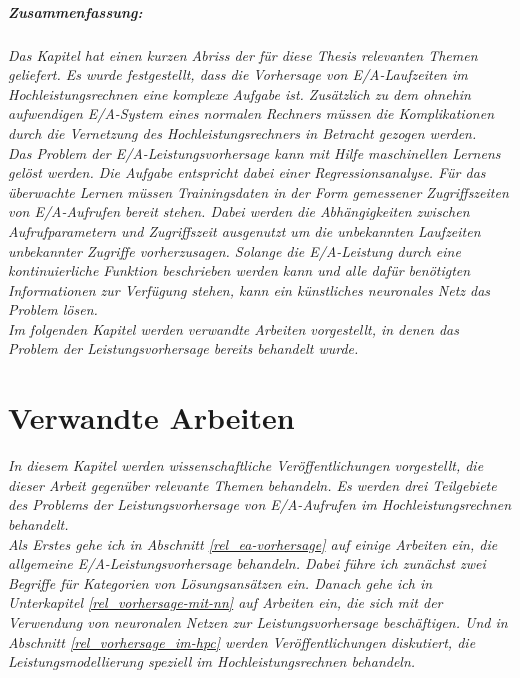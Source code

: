 \documentclass[
	12pt,
	a4paper,
	BCOR10mm,
	DIV14,
	listof=totoc,
	bibliography=totoc,
	headsepline
]{scrreprt}
\begin{document}
\paragraph{Zusammenfassung:}
\textit{ 
	Das Kapitel hat einen kurzen Abriss der für diese Thesis relevanten Themen geliefert. Es wurde festgestellt, dass die Vorhersage von E/A-Laufzeiten im Hochleistungsrechnen eine komplexe Aufgabe ist. Zusätzlich zu dem ohnehin aufwendigen E/A-System eines normalen Rechners müssen die Komplikationen durch die Vernetzung des Hochleistungsrechners in Betracht gezogen werden.\\
	Das Problem der E/A-Leistungsvorhersage kann mit Hilfe maschinellen Lernens gelöst werden. Die Aufgabe entspricht dabei einer Regressionsanalyse. Für das überwachte Lernen müssen Trainingsdaten in der Form gemessener Zugriffszeiten von E/A-Aufrufen bereit stehen. Dabei werden die Abhängigkeiten zwischen Aufrufparametern und Zugriffszeit ausgenutzt um die unbekannten Laufzeiten unbekannter Zugriffe vorherzusagen.
	Solange die E/A-Leistung durch eine kontinuierliche Funktion beschrieben werden kann und alle dafür benötigten Informationen zur Verfügung stehen, kann ein künstliches neuronales Netz das Problem lösen.\\
	Im folgenden Kapitel werden verwandte Arbeiten vorgestellt, in denen das Problem der Leistungsvorhersage bereits behandelt wurde.
}

\chapter{Verwandte Arbeiten}
\label{verwandte_arbeiten}
\textit{%
	In diesem Kapitel werden wissenschaftliche Veröffentlichungen vorgestellt, die dieser Arbeit gegenüber relevante Themen behandeln. Es werden drei Teilgebiete des Problems der Leistungsvorhersage von E/A-Aufrufen im Hochleistungsrechnen behandelt.\\
	Als Erstes gehe ich in Abschnitt \ref{rel_ea-vorhersage} auf einige Arbeiten ein, die allgemeine E/A-Leistungsvorhersage behandeln. Dabei führe ich zunächst zwei Begriffe für Kategorien von Lösungsansätzen ein. Danach gehe ich in Unterkapitel \ref{rel_vorhersage-mit-nn} auf Arbeiten ein, die sich mit der Verwendung von neuronalen Netzen zur Leistungsvorhersage beschäftigen.
	Und in Abschnitt \ref{rel_vorhersage_im-hpc} werden Veröffentlichungen diskutiert, die Leistungsmodellierung speziell im Hochleistungsrechnen behandeln.
}
\bigskip
\end{document}
